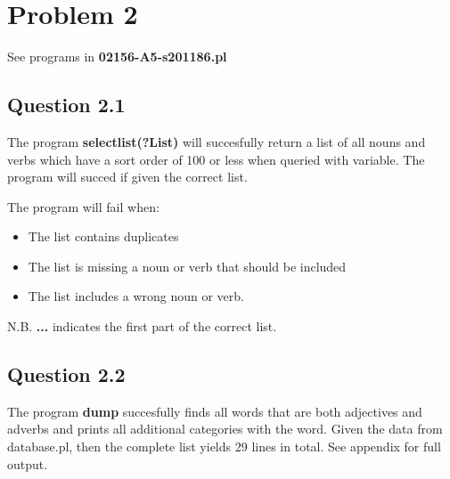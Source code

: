 \newpage
\section*{Problem 2}
See programs in \textbf{02156-A5-s201186.pl}

\subsection*{Question 2.1}
The program \textbf{selectlist(?List)} will succesfully return a list of all nouns and verbs which have a sort order of 100 or less when queried with variable.
The program will succed if given the correct list.

The program will fail when:
\begin{itemize}
    \item The list contains duplicates
    \item The list is missing a noun or verb that should be included
    \item The list includes a wrong noun or verb.
\end{itemize}
N.B. \textbf{...} indicates the first part of the correct list.


\subsection*{Question 2.2}
The program \textbf{dump} succesfully finds all words that are both adjectives and adverbs and prints all additional categories with the word.
Given the data from database.pl, then the complete list yields 29 lines in total. See appendix for full output.